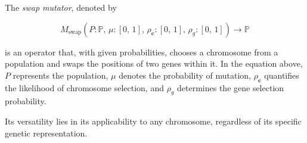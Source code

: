 
  \begin{definition}
  \label{def:keen:op:mut:swap}
    The \emph{swap mutator}, denoted by

    \begin{equation}
      M_\mathrm{swap}(P: \mathbb{P},\, \mu: [0,\, 1],\, \rho_\mathbf{c}: [0,\, 1],\, \rho_g: [0,\, 1]) \to \mathbb{P}
    \end{equation}

    is an operator that, with given probabilities, chooses a chromosome from a 
    population and swaps the positions of two genes within it. In the equation 
    above, \(P\) represents the population, \(\mu\) denotes the probability of 
    mutation, \(\rho_\mathbf{c}\) quantifies the likelihood of chromosome 
    selection, and \(\rho_g\) determines the gene selection probability.

    Its versatility lies in its applicability to any chromosome, regardless of 
    its specific genetic representation.
  \end{definition}
